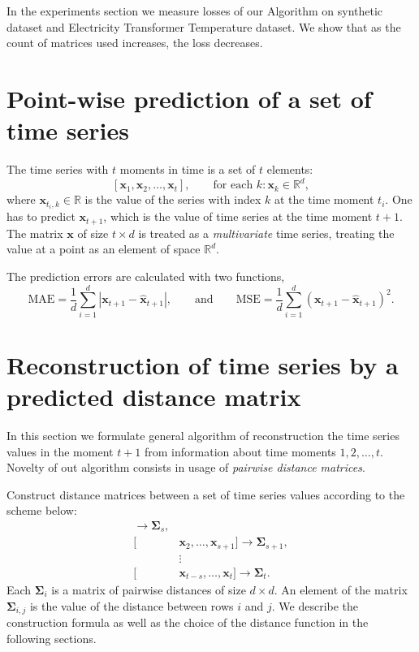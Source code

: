 \documentclass[12pt]{article}
\begin{document}
	In the experiments section we measure losses of our Algorithm on synthetic dataset and Electricity Transformer Temperature dataset. We show that as the count of matrices used increases, the loss decreases.

\section{Point-wise prediction of a set of time series}

The time series with $t$ moments in time is a set of $t$ elements:
\[
[\mathbf{x}_1, \mathbf{x}_2, \ldots, \mathbf{x}_t],\qquad \text{for each } k: \mathbf{x}_k \in \mathbb{R}^d,
\]
where $\mathbf{x}_{t_i, k} \in \mathbb{R}$ is the value of the series with index $k$ at the time moment $t_i$.
One has to predict $\mathbf{x}_{t+1}$, which is the value of time series at the time moment $t+1$. The matrix $\mathbf{x}$ of size $t \times d$ is treated as a \emph{multivariate} time series, treating the value at a point as an element of space $\mathbb{R}^d$.

The prediction errors are calculated with two functions,
\[
\text{MAE} = \frac{1}{d}{\sum_{i=1}^{d} |\mathbf{x}_{t+1} - \mathbf{\hat{x}}_{t+1}|}, 
\qquad \text{and} \qquad 
\text{MSE} = \frac{1}{d}{\sum_{i=1}^{d} (\mathbf{x}_{t+1} - \mathbf{\hat{x}}_{t+1})^2}.
\]

\section{Reconstruction of time series by a predicted distance matrix}

In this section we formulate general algorithm of reconstruction the time series values in the moment $t+1$ from information about time moments $1, 2, \ldots, t$. Novelty of out algorithm consists in usage of \emph{pairwise distance matrices}.

Construct distance matrices between a set of time series values according to the scheme below:
\begin{align*}
	[&\mathbf{x}_1, \ldots, \mathbf{x}_s] \rightarrow \mathbf{\Sigma}_s, \\
	[&\mathbf{x}_2, \ldots, \mathbf{x}_{s+1}] \rightarrow \mathbf{\Sigma}_{s+1}, \\
	&\vdots \\
	[&\mathbf{x}_{t-s}, \ldots, \mathbf{x}_t] \rightarrow \mathbf{\Sigma}_{t}.
\end{align*}
Each $\mathbf{\Sigma}_i$ is a matrix of pairwise distances of size $d \times d$. An element of the matrix $\mathbf{\Sigma}_{i,j}$ is the value of the distance between rows $i$ and $j$. We describe the construction formula as well as the choice of the distance function in the following sections.
\end{document}
